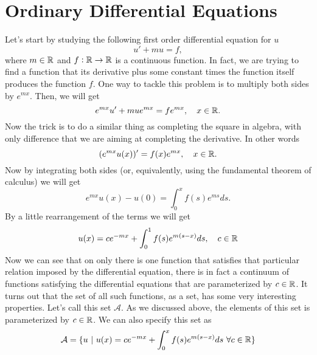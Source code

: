 \chapter{Ordinary Differential Equations}

Let's start by studying the following first order differential equation for $u$
\[ u' + mu = f, \tag{1}\]
where $m\in \mathbb{R}$ and $f:\mathbb{R}\to\mathbb{R}$ is a continuous function. In fact, we are trying to find a function that its derivative plus some constant times the function itself produces the function $f$. One way to tackle this problem is to multiply both sides by $e^{mx}$. Then, we will get
\[ e^{mx}u' + mue^{mx} = f e^{mx},\quad x\in \mathbb{R}. \]
Now the trick is to do a similar thing as completing the square in algebra, with only difference that we are aiming at completing the derivative. In other words
\[ (e^{mx} u(x))' = f(x)e^{mx}, \quad x\in\mathbb{R}. \]
Now by integrating both sides (or, equivalently, using the fundamental theorem of calculus) we will get
\[ e^{mx}u(x) - u(0) = \int_{0}^{x}f(s)e^{ms} ds. \]
By a little rearrangement of the terms we will get
\[ u(x) = ce^{-mx} + \int_{0}^{1}f(s)e^{m(s-x)}ds, \quad c \in \mathbb{R} \]
Now we can see that on only there is one function that satisfies that particular relation imposed by the differential equation, there is in fact a continuum of functions satisfying the differential equations that are parameterized by $c\in \mathbb{R}$. It turns out that the set of all such functions, as a set, has some very interesting properties. Let's call this set $\mathcal{A}$. As we discussed above, the elements of this set is parameterized by $c\in\mathbb{R}$. We can also specify this set as
\begin{equation*}
	\mathcal{A} = \{u\ |\ u(x)=ce^{-mx} + \int_{0}^{x}f(s)e^{m(s-x)}ds\ \forall c\in \mathbb{R}\}
\end{equation*}

